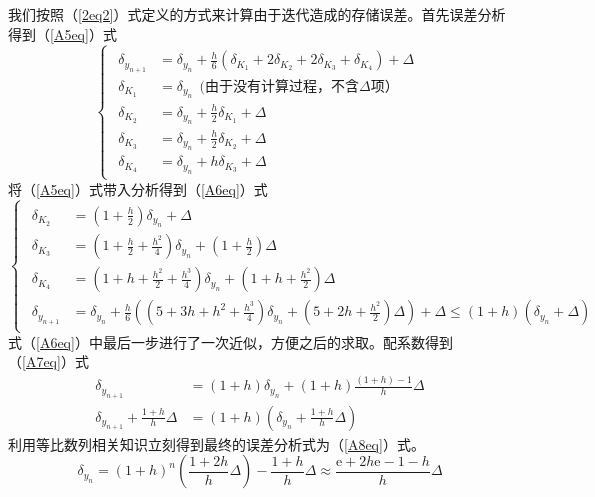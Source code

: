 \documentclass[onecolumn,compsoc]{IEEEtran}
\renewcommand{\|}{\Bigg |}
\newcommand{\e}{\mathrm{e}}
\begin{document}
我们按照（\ref{2eq2}）式定义的方式来计算由于迭代造成的存储误差。首先误差分析得到（\ref{A5eq}）式
\begin{equation}\label{A5eq}\begin{cases}\begin{aligned}
\delta_{y_{n+1}} &= \delta_{y_n} + \frac{h}{6}(\delta_{K_1}+2\delta_{K_2}+2\delta_{K_3}+\delta_{K_4}) + \Delta\\
\delta_{K_1} &= \delta_{y_n} \ \ \text{(由于没有计算过程，不含$\Delta$项）}\\
\delta_{K_2} &= \delta_{y_n} + \frac{h}{2}\delta_{K_1} + \Delta\\
\delta_{K_3} &= \delta_{y_n} + \frac{h}{2}\delta_{K_2} + \Delta\\
\delta_{K_4} &= \delta_{y_n} + h\delta_{K_3} + \Delta
\end{aligned}\end{cases}\end{equation}
将（\ref{A5eq}）式带入分析得到（\ref{A6eq}）式
\begin{equation}\label{A6eq}\begin{cases}\begin{aligned}
\delta_{K_2} &= (1+\frac{h}{2})\delta_{y_n} + \Delta\\
\delta_{K_3} &= (1+\frac{h}{2}+\frac{h^2}{4})\delta_{y_n} + (1+\frac{h}{2})\Delta\\
\delta_{K_4} &= (1+h+\frac{h^2}{2}+\frac{h^3}{4})\delta_{y_n} + (1+h+\frac{h^2}{2})\Delta\\

\delta_{y_{n+1}} &=\delta_{y_n} + \frac{h}{6}((5+3h+h^2+\frac{h^3}{4})\delta_{y_n} + (5+2h+\frac{h^2}{2})\Delta) + \Delta \le (1+h)(\delta_{y_n}+\Delta)
\end{aligned}\end{cases}\end{equation}
式（\ref{A6eq}）中最后一步进行了一次近似，方便之后的求取。配系数得到（\ref{A7eq}）式
\begin{equation}\label{A7eq}\begin{aligned}\delta_{y_{n+1}} &= (1+h)\delta_{y_n}+(1+h)\frac{(1+h)-1}{h}\Delta\\
\delta_{y_{n+1}} + \frac{1+h}{h}\Delta &= (1+h)(\delta_{y_{n}} + \frac{1+h}{h}\Delta)
\end{aligned}\end{equation}
利用等比数列相关知识立刻得到最终的误差分析式为（\ref{A8eq}）式。
\begin{equation}\label{A8eq}
\delta_{y_{n}} = (1+h)^n(\frac{1+2h}{h}\Delta) - \frac{1+h}{h}\Delta\approx\frac{\e+2h\e-1-h}{h}\Delta\end{equation}
\end{document}
